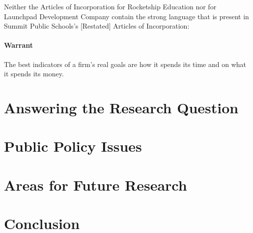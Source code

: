 Neither the Articles of Incorporation for Rocketship Education nor for Launchpad Development Company contain the strong language that is present in Summit Public Schools's [Restated] Articles of Incorporation: 

\paragraph{Warrant}
The best indicators of a firm's real goals are how it spends its time and on what it spends its money.

\section{Answering the Research Question}%
\label{sec:answ-rese-quest}\indent%

\section{Public Policy Issues}%
\label{sec:publ-policy-chang}\indent%

\section{Areas for Future Research}%
\label{sec:issu-future-rese}\indent%

\section{Conclusion}%
\label{sec:conclusion}\indent%



